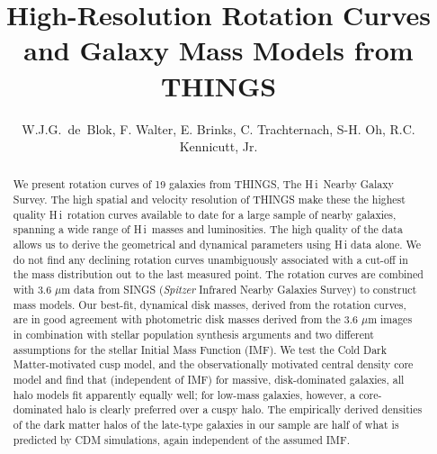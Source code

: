 \documentclass[usenatbib,usegraphicx,apjfonts,floatfix]{emulateapj}
\newcommand{\HI}{H\,{\sc i}}
\begin{document}
\title{High-Resolution Rotation Curves and Galaxy Mass Models from THINGS}
\author{W.J.G.~de~Blok, F. Walter, E. Brinks,
C. Trachternach, S-H. Oh, R.C. Kennicutt, Jr.}



 

 





\begin{abstract}
  We present rotation curves of 19 galaxies from THINGS, The \HI\
  Nearby Galaxy Survey.  The high spatial and velocity resolution of
  THINGS make these the highest quality \HI\ rotation curves available
  to date for a large sample of nearby galaxies, spanning a wide range
  of \HI\ masses and luminosities.  The high quality of the data
  allows us to derive the geometrical and dynamical parameters using
  H\,{\sc i} data alone.  We do not find any declining rotation curves
  unambiguously associated with a cut-off in the mass distribution out
  to the last measured point.  The rotation curves are combined with
  3.6 $\mu$m data from SINGS (\emph{Spitzer} Infrared Nearby Galaxies
  Survey) to construct mass models. Our best-fit, dynamical disk
  masses, derived from the rotation curves, are in good agreement with
  photometric disk masses derived from the 3.6 $\mu$m images in
  combination with stellar population synthesis arguments and two
  different assumptions for the stellar Initial Mass Function (IMF).
  We test the Cold Dark Matter-motivated cusp model, and the
  observationally motivated central density core model and find that
  (independent of IMF) for massive, disk-dominated galaxies, all halo
  models fit apparently equally well; for low-mass galaxies, however,
  a core-dominated halo is clearly preferred over a cuspy halo.  The
  empirically derived densities of the dark matter halos of the
  late-type galaxies in our sample are half of what is predicted by
  CDM simulations, again independent of the assumed IMF.
\end{abstract}
\end{document}
